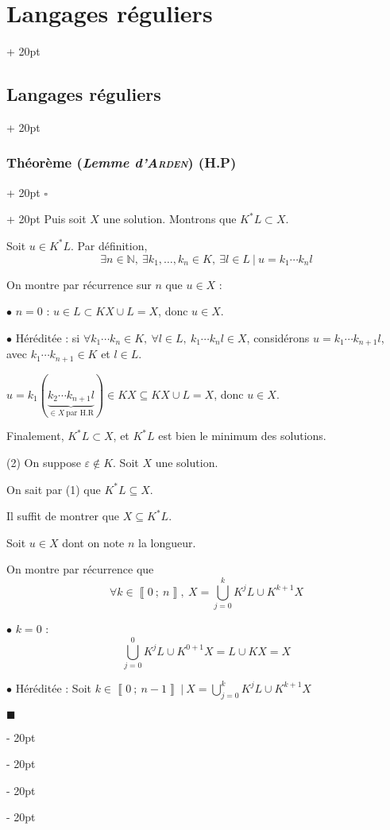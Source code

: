 \documentclass[a4paper, 12pt, twoside]{article}
\newcommand{\N}{\mathbb{N}} %
\newcommand{\nset}[2]{\left\llbracket #1\ ;\ #2 \right\rrbracket}
\newcommand{\ind}[1][20pt]{\advance\leftskip + #1}
\newcommand{\deind}[1][20pt]{\advance\leftskip - #1}
\newenvironment{indt}[2][20pt]{#2 \par \ind[#1]}{\par \deind} %
\newenvironment{proof}[1][{}]{\begin{indt}{$\square$ #1}}{$\blacksquare$ \end{indt}}
\begin{document}
\begin{indt}{\section{Langages réguliers}}
\begin{indt}{\subsection{Langages réguliers}}
\begin{indt}{\subsubsection{Théorème (\textit{Lemme d'\textsc{Arden}}) (H.P)}}
\begin{proof}
                    Puis soit $X$ une solution. Montrons que $K^* L \subset X$.

                    Soit $u \in K^* L$. Par définition,
                    \[
                        \exists n \in \N,\ \exists k_1, \ldots, k_n \in K,\ \exists l \in L\ |\
                        u = k_1 \cdots k_n l
                    \]

                    On montre par récurrence sur $n$ que $u \in X$ :

                    $\bullet$ $n = 0$ :
                    $u \in L \subset KX\cup L = X$, donc $u \in X$.

                    \vspace{6pt}
                    
                    $\bullet$ Héréditée :
                    si $\forall k_1 \cdots k_n \in K,\ \forall l \in L,\ k_1 \cdots k_n l \in X$, considérons $u = k_1 \cdots k_{n + 1} l$, avec $k_1 \cdots k_{n + 1} \in K$ et $l \in L$.

                    $u = k_1(\underbrace{k_2 \cdots k_{n + 1}l}_{\in X\ \text{par H.R}}) \in KX \subseteq KX \cup L = X$, donc $u \in X$.

                    Finalement, $K^* L \subset X$, et $K^*L$ est bien le minimum des solutions.

                    \vspace{12pt}
                    
                    (2) On suppose $\varepsilon \notin K$. Soit $X$ une solution.

                    On sait par (1) que $K^*L \subseteq X$.

                    Il suffit de montrer que $X \subseteq K^* L$.

                    Soit $u \in X$ dont on note $n$ la longueur.

                    On montre par récurrence que
                    \[
                        \forall k \in \nset 0 n,\ X = \bigcup_{j = 0}^k K^j L \cup K^{k + 1} X
                    \]

                    \vspace{6pt}
                    
                    $\bullet$ $k = 0$ :
                    \[
                        \bigcup_{j = 0}^0 K^j L \cup K^{0 + 1} X = L \cup KX = X
                    \]

                    $\bullet$ Héréditée : Soit $k \in \nset 0 {n - 1} \ |\ X = \displaystyle \bigcup_{j = 0}^k K^j L \cup K^{k + 1} X$


\end{proof}
\end{indt}
\end{indt}
\end{indt}
\end{document}
